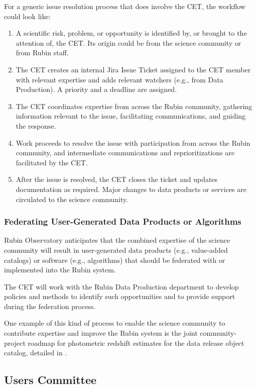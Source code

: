 \documentclass[DM,lsstdraft,toc]{lsstdoc}
\begin{document}
For a generic issue resolution process that does involve the CET, the workflow could look like:
\begin{enumerate}
\item A scientific risk, problem, or opportunity is identified by, or brought to the attention of, the CET. Its origin could be from the science community or from Rubin staff.
\item The CET creates an internal Jira Issue Ticket assigned to the CET member with relevant expertise and adds relevant watchers (e.g., from Data Production). A priority and a deadline are assigned. 
\item The CET coordinates expertise from across the Rubin community, gathering information relevant to the issue, facilitating communications, and guiding the response.
\item Work proceeds to resolve the issue with participation from across the Rubin community, and intermediate communications and reprioritizations are facilitated by the CET.
\item After the issue is resolved, the CET closes the ticket and updates documentation as required. Major changes to data products or services are circulated to the science community.
\end{enumerate}


\subsubsection{Federating User-Generated Data Products or Algorithms}\label{sssec:mod_coord_ug}

Rubin Observatory anticipates that the combined expertise of the science community will result in user-generated data products (e.g., value-added catalogs) or software (e.g., algorithms) that should be federated with or implemented into the Rubin system.

The CET will work with the Rubin Data Production department to develop policies and methods to identify such opportunities and to provide support during the federation process.

One example of this kind of process to enable the science community to contribute expertise and improve the Rubin system is the joint community-project roadmap for photometric redshift estimates for the data release object catalog, detailed in .


\subsection{Users Committee}\label{sssec:mod_coord_uc}
\end{document}
